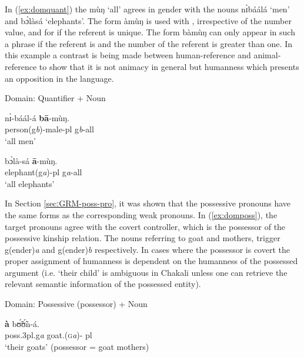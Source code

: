 \begin{exe}
\begin{exe}
\begin{exe}
\begin{exe}
\begin{exe}
\begin{exe}
\begin{exe}
\begin{exe}
\begin{exe}
\begin{exe}
\begin{exe}
In (\ref{ex:domquant}) the  {\sls mùŋ} `all' agrees in gender with the nouns {\sls nɪ̀báálá} `men' and {\sls bɔ̀làsá} `elephants'.  The form {\sls àmùŋ} is used with , irrespective of the number value, and for  if the referent is unique. The form  {\sls bàmùŋ} can only  appear in such a phrase if the referent is  and the number of the referent is greater than one. In this example a contrast is being made between human-reference and animal-reference to show that it is not animacy in general but humanness which presents an opposition in the language.


\newpage 

\ea\label{ex:domquant}{\rm Domain: Quantifier + Noun}\\
\ea\label{ex:domquantH+}

\gll   nɪ̀-báál-á  \textbf{bā}-mùŋ.\\
    {person({\sc g}{\it b})-male-{\sc pl}} {\sc g}{\it b}-{\sc all}\\
\glt `all men'\\

\ex\label{ex:domquantH-}

\gll   bɔ̀là-sá  \textbf{ā}-mùŋ.\\
  {elephant({\sc g}{\it a})-{\sc pl}}  {\sc g}{\it a}-{\sc all}\\
\glt `all elephants'\\


\z 
 \z

In Section \ref{secːGRM-poss-pro}, it was shown   that the possessive pronouns have the same forms as the corresponding weak pronouns.  In (\ref{ex:domposs}),  the target pronouns agree with the covert controller, which is the possessor of the possessive kinship relation. The nouns referring to goat and  mothers, trigger {\sc g(ender)}{\it a} and {\sc g(ender)}{\it b} respectively. In cases where the possessor is covert the proper assignment of humanness is dependent on the humanness of the possessed argument (i.e. `their child' is ambiguous in Chakali unless one can retrieve the relevant semantic  information of the possessed entity).

\ea\label{ex:domposs}{\rm Domain: Possessive (possessor) + Noun}\\

\ea\label{ex:dompossH-}

\gll  \textbf{à}   bʊ̃́ʊ̃́n-á.\\
   {\sc poss.3pl.g}{\it a} {goat.(\textsc{g}{\it a})-{\sc
pl}}\\
\glt `their goats' (possessor = goat mothers) 


\end{exe}
\end{exe}
\end{exe}
\end{exe}
\end{exe}
\end{exe}
\end{exe}
\end{exe}
\end{exe}
\end{exe}
\end{exe}

